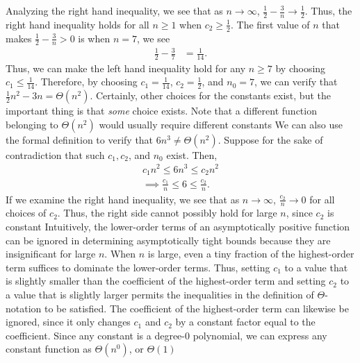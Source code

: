 \documentclass{report}
\begin{document}
        \bigbreak \noindent 
        Analyzing the right hand inequality, we see that as $n\to \infty$, $\frac{1}{2}-\frac{3}{n} \to \frac{1}{2} $. Thus, the right hand inequality holds for all $n \geq 1$ when $c_{2} \geq \frac{1}{2}$. The first value of $n$ that makes $\frac{1}{2}-\frac{3}{n} > 0 $ is when $n=7$, we see
        \begin{align*}
            \frac{1}{2}-\frac{3}{7} &= \frac{1}{14}
        .\end{align*}
        Thus, we can make the left hand inequality hold for any $n \geq 7$ by choosing $c_{1} \leq \frac{1}{14} $. Therefore, by choosing $c_{1} = \frac{1}{14}$, $c_{2} = \frac{1}{2} $, and $n_{0} = 7 $, we can verify that $\frac{1}{2}n^{2} -3n = \Theta(n^{2}) $. Certainly, other choices for the constants exist, but the important thing is that \textit{some} choice exists.
        \bigbreak \noindent 
        Note that a different function belonging to $\Theta(n^{2})$ would usually require different constants
        \bigbreak \noindent 
        We can also use the formal definition to verify that $6n^{3} \ne \Theta(n^{2})$. Suppose for the sake of contradiction that such $c_{1}, c_{2}$, and $n_{0}$ exist. Then,
        \begin{align*}
            c_{1}n^{2} \leq 6n^{3} \leq c_{2}n^{2} \\
            \implies \frac{c_{1}}{n} \leq 6 \leq \frac{c_{2}}{n}
        .\end{align*}
        \bigbreak \noindent 
        If we examine the right hand inequality, we see that as $n\to \infty$, $\frac{c_{2}}{n}\to 0 $ for all choices of $c_{2}$. Thus, the right side cannot possibly hold for large $n$, since $c_{2}$ is constant
        \bigbreak \noindent 
        Intuitively, the lower-order terms of an asymptotically positive function can be
        ignored in determining asymptotically tight bounds because they are insignificant
        for large $n$. When $n$ is large, even a tiny fraction of the highest-order term suffices to dominate the lower-order terms. Thus, setting $c_1$ to a value that is slightly
        smaller than the coefficient of the highest-order term and setting $c_2$ to a value that
        is slightly larger permits the inequalities in the definition of $\Theta$-notation to be satisfied. The coefficient of the highest-order term can likewise be ignored, since it
        only changes $c_1$ and $c_2$ by a constant factor equal to the coefficient.
        \bigbreak \noindent 
        Since any constant is a degree-0 polynomial, we can express any constant function as $\Theta(n^{0}) $, or $\Theta(1) $
\end{document}

